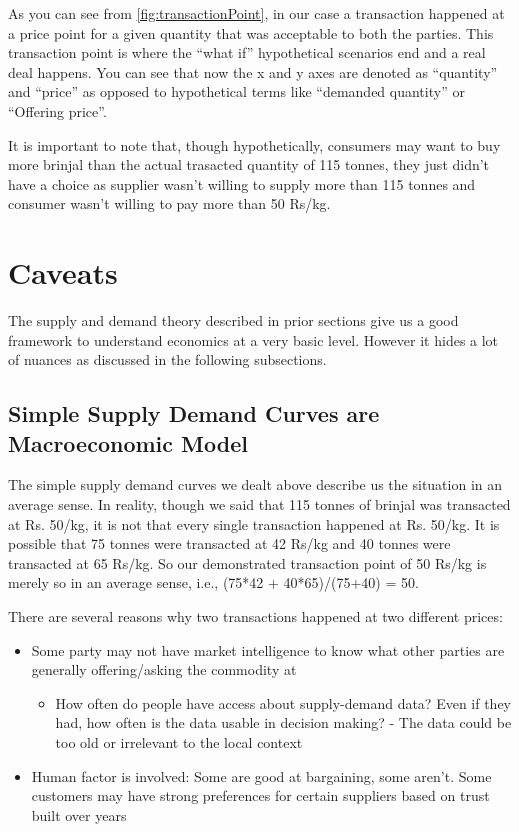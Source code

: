 As you can see from \autoref{fig:transactionPoint}, in our case a transaction happened at a price point for a given quantity that was acceptable to both the parties. This transaction point is where the ``what if'' hypothetical scenarios end and a real deal happens. You can see that now the x and y axes are denoted as ``quantity'' and ``price'' as opposed to hypothetical terms like ``demanded quantity'' or ``Offering price''. 

It is important to note that, though hypothetically, consumers may want to buy more brinjal than the actual trasacted quantity of 115 tonnes, they just didn't have a choice as supplier wasn't willing to supply more than 115 tonnes and consumer wasn't willing to pay more than 50 Rs/kg. 

\section{Caveats}
The supply and demand theory described in prior sections give us a good framework to understand economics at a very basic level. However it hides a lot of nuances as discussed in the following subsections.

\subsection{Simple Supply Demand Curves are Macroeconomic Model}
The simple supply demand curves we dealt above describe us the situation in an average sense. In reality, though we said that 115 tonnes of brinjal was transacted at Rs. 50/kg, it is not that every single transaction happened at Rs. 50/kg. It is possible that 75 tonnes were transacted at 42 Rs/kg and 40 tonnes were transacted at 65 Rs/kg. So our demonstrated transaction point of 50 Rs/kg is merely so in an average sense, i.e., (75*42 + 40*65)/(75+40) = 50.

There are several reasons why two transactions happened at two different prices:
\begin{itemize}
	\item Some party may not have market intelligence to know what other parties are generally offering/asking the commodity at
	\begin{itemize}
		\item How often do people have access about supply-demand data? Even if they had, how often is the data usable in decision making? - The data could be too old or irrelevant to the local context
	\end{itemize}
	\item Human factor is involved: Some are good at bargaining, some aren't. Some customers may have strong preferences for certain suppliers based on trust built over years
\end{itemize}	


